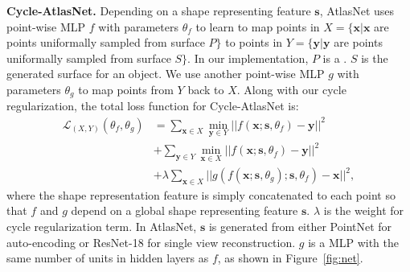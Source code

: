 \noindent\textbf{Cycle-AtlasNet.} Depending on a shape representing feature $\mathbf{s}$, AtlasNet uses point-wise MLP
$f$ with parameters $\theta_f$ to learn to map points in $X=\{\mathbf{x}| \mathbf{x}$ are points uniformally sampled from surface $P\}$ to points in $Y=\{\mathbf{y}| \mathbf{y}$ are points uniformally sampled from surface $S\}$. In our implementation, $P$ is a . $S$ is the generated surface for an object. We use another point-wise MLP $g$ with parameters $\theta_g$ to map points from $Y$ back to $X$. Along with our cycle regularization, the total loss function for Cycle-AtlasNet is:
\begin{equation}
\begin{aligned}
\label{equ:atlascycle}
\mathcal{L}_{(X,Y)}(\theta_f,\theta_g) &= \sum_{\mathbf{x} \in X} \min_{\mathbf{y} \in Y}|| f(\mathbf{x};\mathbf{s},\theta_f) - \mathbf{y} ||^2 \\ &+ \sum_{ \mathbf{y} \in Y}\min_{ \mathbf{x} \in X} || f(\mathbf{x};\mathbf{s},\theta_f) - \mathbf{y} ||^2 \\ &+ \lambda\sum_{\mathbf{x} \in X}||g(f(\mathbf{x};\mathbf{s},\theta_g);\mathbf{s},\theta_f) - \mathbf{x}||^2,
\end{aligned}
 \end{equation}
where the shape representation feature is simply concatenated to each point so that $f$ and $g$ depend on a global shape representing feature $\mathbf{s}$. $\lambda$ is the weight for cycle regularization term. In AtlasNet, $\mathbf{s}$ is generated from either PointNet \cite{resnet} for auto-encoding or ResNet-18 \cite{resnet} for single view reconstruction. $g$ is a MLP with the same number of units in hidden layers as $f$, as shown in Figure~\ref{fig:net}.

